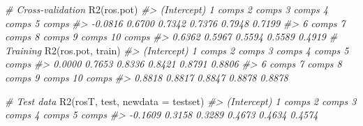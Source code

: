 \documentclass[
]{article}
\newenvironment{Shaded}{\begin{snugshade}}{\end{snugshade}}
\newcommand{\AttributeTok}[1]{\textcolor[rgb]{0.77,0.63,0.00}{#1}}
\newcommand{\CommentTok}[1]{\textcolor[rgb]{0.56,0.35,0.01}{\textit{#1}}}
\newcommand{\FunctionTok}[1]{\textcolor[rgb]{0.00,0.00,0.00}{#1}}
\newcommand{\NormalTok}[1]{#1}
\newcommand{\StringTok}[1]{\textcolor[rgb]{0.31,0.60,0.02}{#1}}
\begin{document}
\begin{Shaded}
\begin{Highlighting}[]
\CommentTok{\# Cross{-}validation}
\FunctionTok{R2}\NormalTok{(ros.pot)}
\CommentTok{\#\textgreater{} (Intercept)      1 comps      2 comps      3 comps      4 comps      5 comps  }
\CommentTok{\#\textgreater{}     {-}0.0816       0.6700       0.7342       0.7376       0.7948       0.7199  }
\CommentTok{\#\textgreater{}     6 comps      7 comps      8 comps      9 comps     10 comps  }
\CommentTok{\#\textgreater{}      0.6362       0.5967       0.5594       0.5589       0.4919}
\CommentTok{\# Training}
\FunctionTok{R2}\NormalTok{(ros.pot, }\StringTok{\textquotesingle{}train\textquotesingle{}}\NormalTok{)}
\CommentTok{\#\textgreater{} (Intercept)      1 comps      2 comps      3 comps      4 comps      5 comps  }
\CommentTok{\#\textgreater{}      0.0000       0.7653       0.8336       0.8421       0.8791       0.8806  }
\CommentTok{\#\textgreater{}     6 comps      7 comps      8 comps      9 comps     10 comps  }
\CommentTok{\#\textgreater{}      0.8818       0.8817       0.8847       0.8878       0.8878}

\CommentTok{\# Test data}
\FunctionTok{R2}\NormalTok{(rosT, }\StringTok{\textquotesingle{}test\textquotesingle{}}\NormalTok{, }\AttributeTok{newdata =}\NormalTok{ testset)}
\CommentTok{\#\textgreater{} (Intercept)      1 comps      2 comps      3 comps      4 comps      5 comps  }
\CommentTok{\#\textgreater{}     {-}0.1609       0.3158       0.3289       0.4673       0.4634       0.4574}
\end{Highlighting}
\end{Shaded}
\end{document}

